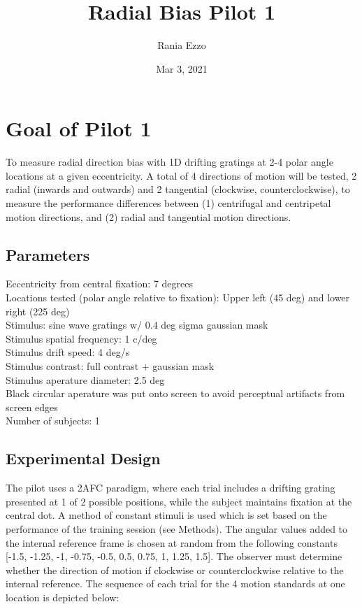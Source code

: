 \documentclass[11pt]{article} %
\title{Radial Bias Pilot 1}
\date{Mar 3, 2021}
\author{Rania Ezzo}
\begin{document}
\maketitle
\tableofcontents


\section{Goal of Pilot 1}
To measure radial direction bias with 1D drifting gratings at 2-4 polar angle locations at a given eccentricity. A total of 4 directions of motion will be tested, 2 radial (inwards and outwards) and 2 tangential (clockwise, counterclockwise), to measure the performance differences between (1) centrifugal and centripetal motion directions, and (2) radial and tangential motion directions. 

\subsection{Parameters}
Eccentricity from central fixation: 7 degrees
\\
Locations tested (polar angle relative to fixation): Upper left (45 deg) and lower right (225 deg)
\\
Stimulus: sine wave gratings w/ 0.4 deg sigma gaussian mask
\\
Stimulus spatial frequency: 1 c/deg
\\
Stimulus drift speed: 4 deg/s
\\
Stimulus contrast: full contrast + gaussian mask
\\
Stimulus aperature diameter: 2.5 deg
\\
Black circular aperature was put onto screen to avoid perceptual artifacts from screen edges
\\
Number of subjects: 1

\subsection{Experimental Design}
The pilot uses a 2AFC paradigm, where each trial includes a drifting grating presented at 1 of 2 possible positions, while the subject maintains fixation at the central dot. A method of constant stimuli is used which is set based on the performance of the training session (see Methods). The angular values added to the internal reference frame is chosen at random from the following constants [-1.5, -1.25, -1, -0.75, -0.5, 0.5, 0.75, 1, 1.25, 1.5]. The observer must determine whether the direction of motion if clockwise or counterclockwise relative to the internal reference. The sequence of each trial for the 4 motion standards at one location is depicted below:
\end{document}
